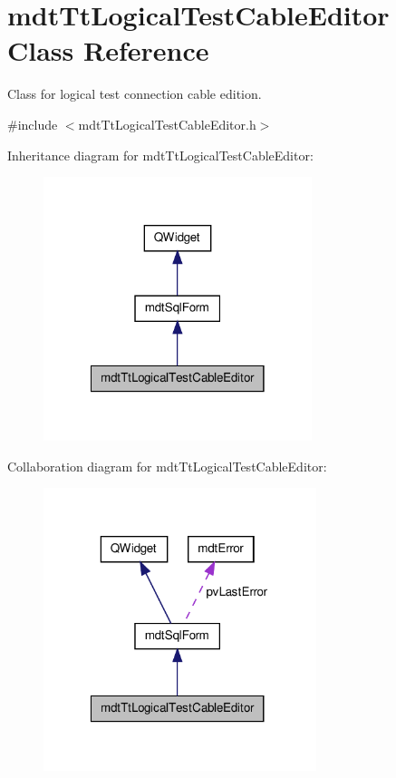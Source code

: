 \hypertarget{classmdt_tt_logical_test_cable_editor}{\section{mdt\-Tt\-Logical\-Test\-Cable\-Editor Class Reference}
\label{classmdt_tt_logical_test_cable_editor}
}


Class for logical test connection cable edition.  




{\ttfamily \#include $<$mdt\-Tt\-Logical\-Test\-Cable\-Editor.\-h$>$}



Inheritance diagram for mdt\-Tt\-Logical\-Test\-Cable\-Editor\-:
\nopagebreak
\begin{figure}[H]
\begin{center}
\leavevmode
\includegraphics[width=222pt]{classmdt_tt_logical_test_cable_editor__inherit__graph}
\end{center}
\end{figure}


Collaboration diagram for mdt\-Tt\-Logical\-Test\-Cable\-Editor\-:
\nopagebreak
\begin{figure}[H]
\begin{center}
\leavevmode
\includegraphics[width=226pt]{classmdt_tt_logical_test_cable_editor__coll__graph}
\end{center}
\end{figure}

